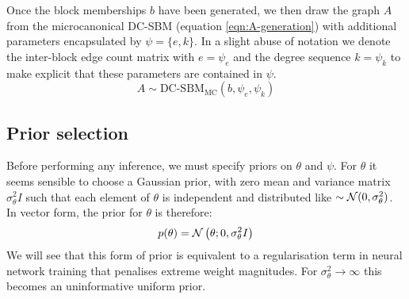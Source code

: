 Once the block memberships $b$ have been generated, we then draw the graph $A$ from the microcanonical DC-SBM (equation \ref{eqn:A-generation}) with additional parameters encapsulated by $\psi = \{e, k\}$. In a slight abuse of notation we denote the inter-block edge count matrix with $e = \psi_e$ and the degree sequence $k = \psi_k$ to make explicit that these parameters are contained in $\psi$.
%
\begin{equation}
	A \sim \textrm{DC-SBM}_{\textrm{MC}} (b, \psi_e, \psi_k)
	\label{eqn:A-generation}
\end{equation}


\subsection{Prior selection}

Before performing any inference, we must specify priors on $\theta$ and $\psi$. For $\theta$ it seems sensible to choose a Gaussian prior, with zero mean and variance matrix $\sigma^2_\theta I$ such that each element of $\theta$ is independent and distributed like $\sim \mathcal{N}(0, \sigma_\theta^2)$. In vector form, the prior for $\theta$ is therefore:
%
\begin{equation}
	p(\theta) = \mathcal{N} \left( \theta ; 0, \sigma_\theta^2 I \right)
	\label{eqn:theta-prior}
\end{equation}
%
We will see that this form of prior is equivalent to a regularisation term in neural network training that penalises extreme weight magnitudes. For $\sigma_\theta^2 \rightarrow \infty$ this becomes an uninformative uniform prior.

